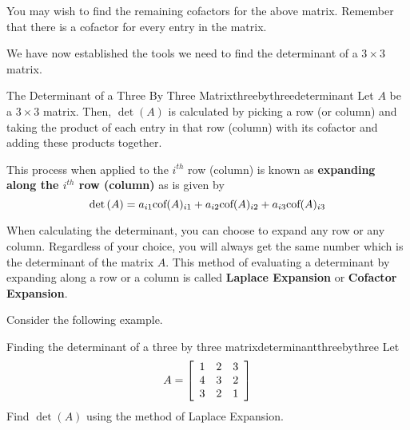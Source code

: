 You may wish to find the remaining cofactors for the above matrix. Remember that there is a cofactor 
for every entry in the matrix.  

We have now established the tools we need to find the determinant of a $3 \times3 $ matrix.

\begin{definition}{The Determinant of a Three By Three Matrix}{threebythreedeterminant}
Let $A$ be a $3\times 3$ matrix. Then, $\det \left(A\right)$ is calculated by picking a row
(or column) and taking the product of each entry in that row (column) with its
cofactor and adding these products together. 

This process when applied to the $i^{th}$
row (column) is known as \textbf{expanding along the $i^{th}$ row
(column)} as is given by 
\[
\det \left(A\right) = a_{i1}\mbox{cof}(A)_{i1} + a_{i2}\mbox{cof}(A)_{i2} + a_{i3}\mbox{cof}(A)_{i3}
\]

\end{definition}

When calculating the determinant, you can choose to expand any row or any column. Regardless 
of your choice, you will always get the same number which is the determinant of the matrix $A.$ 
This method of evaluating a determinant by expanding along a row or a column is called \textbf{Laplace
Expansion} or \textbf{Cofactor Expansion}.


Consider the following example. 

\begin{example}{Finding the determinant of a three by three matrix}{determinantthreebythree}
Let 
\begin{equation*}
A=\left[
\begin{array}{rrr}
1 & 2 & 3 \\
4 & 3 & 2 \\
3 & 2 & 1
\end{array}
\right] 
\end{equation*}
Find $\det\left(A\right)$ using the method of Laplace Expansion.
\end{example}


